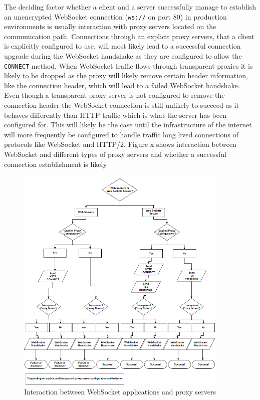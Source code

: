 The deciding factor whether a client and a server successfully manage to establish an unencrypted WebSocket connection (\texttt{ws://} on port 80) in production environments is usually interaction with proxy servers located on the communication path. Connections through an explicit proxy servers, that a client is explicitly configured to use, will most likely lead to a successful connection upgrade during the WebSocket handshake as they are configured to allow the \texttt{CONNECT} method. When WebSocket traffic flows through transparent proxies it is likely to be dropped as the proxy will likely remove certain header information, like the connection header, which will lead to a failed WebSocket handshake. Even though a transparent proxy server is not configured to remove the connection header the WebSocket connection is still unlikely to succeed as it behaves differently than HTTP traffic which is what the server has been configured for. This will likely be the case until the infrastructure of the internet will more frequently be configured to handle traffic long lived connections of protocols like WebSocket and HTTP/2. Figure x shows interaction between WebSocket and different types of proxy servers and whether a successful connection establishment is likely.
\\
\begin{figure}[h!]
	\centering
	\includegraphics[width=0.9\textwidth]{images/websocketProxyServer}
	\caption{Interaction between WebSocket applications and proxy servers \cite{wang2013definitive}}
	\label{fig:webSocketMessagingSystem}
\end{figure}

